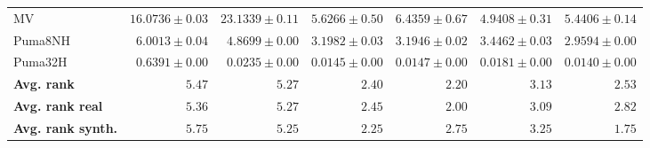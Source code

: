 \begin{table*}[!htbp]
{\begin{tabular}{lrrrrrr}
		MV & $16.0736 \pm 0.03$ & $23.1339 \pm 0.11$ & $5.6266 \pm 0.50$ & $6.4359 \pm 0.67$ & $\mathbf{4.9408 \pm 0.31}$ & $5.4406 \pm 0.14$\\
		Puma8NH & $6.0013 \pm 0.04$ & $4.8699 \pm 0.00$ & $3.1982 \pm 0.03$ & $3.1946 \pm 0.02$ & $3.4462 \pm 0.03$ & $\mathbf{2.9594 \pm 0.00}$\\
		Puma32H & $0.6391 \pm 0.00$ & $0.0235 \pm 0.00$ & $0.0145 \pm 0.00$ & $0.0147 \pm 0.00$ & $0.0181 \pm 0.00$ & $\mathbf{0.0140 \pm 0.00}$\\
		\midrule
		\textbf{{Avg. rank}} & $5.47$ & $5.27$ & $2.40$ & $\mathbf{2.20}$ & $3.13$ & $2.53$\\
		\textbf{{Avg. rank real}} & $5.36$ & $5.27$ & $2.45$ & $\mathbf{2.00}$ & $3.09$ & $2.82$\\
		\textbf{{Avg. rank synth.}} & $5.75$ & $5.25$ & $2.25$ & $2.75$ & $3.25$ & $\mathbf{1.75}$\\
		\bottomrule
	\end{tabular}}
\end{table*}
